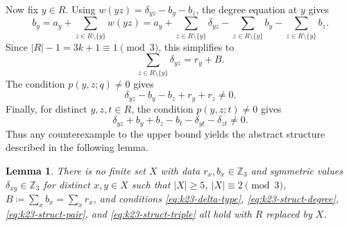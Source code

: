 ﻿\documentclass[11pt]{article}
\numberwithin{equation}{section}
\newtheorem{lemma}[theorem]{Lemma}
\theoremstyle{remark}
\newcommand{\Z}{\mathbb Z}
\begin{document}
Now fix $y\in R$. Using \(w(yz)=\delta_{yz}-b_y-b_z\), the degree equation at \(y\) gives
\[
    b_y=a_y+\sum_{z\in R\setminus\{y\}}w(yz)=a_y+\sum_{z\in R\setminus\{y\}}\delta_{yz}-\sum_{z\in R\setminus\{y\}}b_y-\sum_{z\in R\setminus\{y\}}b_z.
\]
Since $|R|-1=3k+1\equiv1\pmod3$, this simplifies to
\begin{equation}\label{eq:k23-struct-degree}
    \sum_{z\in R\setminus\{y\}}\delta_{yz}=r_y+B.
\end{equation}
The condition $p(y,z;q)\ne0$ gives
\begin{equation}\label{eq:k23-struct-pair}
    \delta_{yz}-b_y-b_z+r_y+r_z\ne0.
\end{equation}
Finally, for distinct $y,z,t\in R$, the condition $p(y,z;t)\ne0$ gives
\begin{equation}\label{eq:k23-struct-triple}
    \delta_{yz}+b_y+b_z-b_t-\delta_{yt}-\delta_{zt}\ne0.
\end{equation}
Thus any counterexample to the upper bound yields the abstract structure described in the following lemma.

\begin{lemma}\label{lem:k23-structure}
    There is no finite set $X$ with data $r_x,b_x\in\Z_3$ and symmetric values $\delta_{xy}\in\Z_3$ for distinct $x,y\in X$ such that $|X|\ge 5$, $|X|\equiv2\pmod3$, $B\coloneqq\sum_xb_x=\sum_xr_x$, and conditions \eqref{eq:k23-delta-type}, \eqref{eq:k23-struct-degree}, \eqref{eq:k23-struct-pair}, and \eqref{eq:k23-struct-triple} all hold with $R$ replaced by $X$.
\end{lemma}
\end{document}
